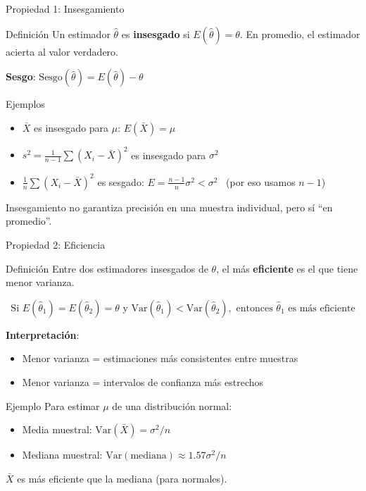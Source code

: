 \documentclass[aspectratio=169, 11pt]{beamer}
\begin{document}
\begin{frame}{Propiedad 1: Insesgamiento}
\begin{block}{Definición}
Un estimador $\hat{\theta}$ es \textbf{insesgado} si $E(\hat{\theta}) = \theta$.
En promedio, el estimador acierta al valor verdadero.
\end{block}

\textbf{Sesgo}: $\text{Sesgo}(\hat{\theta}) = E(\hat{\theta}) - \theta$

\begin{exampleblock}{Ejemplos}
\begin{itemize}
\item $\bar{X}$ es insesgado para $\mu$: $E(\bar{X}) = \mu$
\item $s^2 = \frac{1}{n-1}\sum(X_i-\bar{X})^2$ es insesgado para $\sigma^2$
\item $\frac{1}{n}\sum(X_i-\bar{X})^2$ es \alert{sesgado}: $E = \frac{n-1}{n}\sigma^2 < \sigma^2$ \ (por eso usamos $n-1$)
\end{itemize}
\end{exampleblock}

\alert{Insesgamiento no garantiza precisión en una muestra individual, pero sí ``en promedio''.}
\end{frame}

\begin{frame}{Propiedad 2: Eficiencia}
\begin{block}{Definición}
Entre dos estimadores insesgados de $\theta$, el más \textbf{eficiente} es el que tiene menor varianza.
\end{block}

\[
\text{Si } E(\hat{\theta}_1) = E(\hat{\theta}_2) = \theta \text{ y } \text{Var}(\hat{\theta}_1) < \text{Var}(\hat{\theta}_2), \text{ entonces } \hat{\theta}_1 \text{ es más eficiente}
\]

\vspace{0.3em}
\textbf{Interpretaci\'on}:
\begin{itemize}
\item Menor varianza = estimaciones m\'as consistentes entre muestras
\item Menor varianza = intervalos de confianza m\'as estrechos
\end{itemize}

\vspace{0.3em}
\begin{exampleblock}{Ejemplo}
Para estimar $\mu$ de una distribuci\'on normal:
\begin{itemize}
\item Media muestral: $\text{Var}(\bar{X}) = \sigma^2/n$
\item Mediana muestral: $\text{Var}(\text{mediana}) \approx 1.57 \sigma^2/n$
\end{itemize}
$\bar{X}$ es más eficiente que la mediana (para normales).
\end{exampleblock}
\end{frame}
\end{document}

